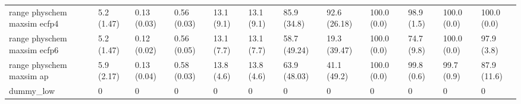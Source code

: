 \begin{tabular}{llllllllllll}
range physchem maxsim ecfp4 & {\cellcolor[HTML]{F0F9FB}} \color[HTML]{000000} 5.2 (1.47) & {\cellcolor[HTML]{E1F4F6}} \color[HTML]{000000} 0.13 (0.03) & {\cellcolor[HTML]{4DB585}} \color[HTML]{F1F1F1} 0.56 (0.03) & {\cellcolor[HTML]{F7FCFD}} \color[HTML]{000000} 13.1 (9.1) & {\cellcolor[HTML]{F7FCFD}} \color[HTML]{000000} 13.1 (9.1) & {\cellcolor[HTML]{05712F}} \color[HTML]{F1F1F1} 85.9 (34.8) & {\cellcolor[HTML]{005B25}} \color[HTML]{F1F1F1} 92.6 (26.18) & {\cellcolor[HTML]{00441B}} \color[HTML]{F1F1F1} 100.0 (0.0) & {\cellcolor[HTML]{00441B}} \color[HTML]{F1F1F1} 98.9 (1.5) & {\cellcolor[HTML]{00441B}} \color[HTML]{F1F1F1} 100.0 (0.0) & {\cellcolor[HTML]{006B2B}} \color[HTML]{F1F1F1} 100.0 (0.0) \\
range physchem maxsim ecfp6 & {\cellcolor[HTML]{F0F9FB}} \color[HTML]{000000} 5.2 (1.47) & {\cellcolor[HTML]{E1F4F6}} \color[HTML]{000000} 0.12 (0.02) & {\cellcolor[HTML]{4BB382}} \color[HTML]{F1F1F1} 0.56 (0.05) & {\cellcolor[HTML]{F7FCFD}} \color[HTML]{000000} 13.1 (7.7) & {\cellcolor[HTML]{F7FCFD}} \color[HTML]{000000} 13.1 (7.7) & {\cellcolor[HTML]{4CB484}} \color[HTML]{F1F1F1} 58.7 (49.24) & {\cellcolor[HTML]{D8F0EF}} \color[HTML]{000000} 19.3 (39.47) & {\cellcolor[HTML]{00441B}} \color[HTML]{F1F1F1} 100.0 (0.0) & {\cellcolor[HTML]{00441B}} \color[HTML]{F1F1F1} 74.7 (9.8) & {\cellcolor[HTML]{00441B}} \color[HTML]{F1F1F1} 100.0 (0.0) & {\cellcolor[HTML]{006328}} \color[HTML]{F1F1F1} 97.9 (3.8) \\
range physchem maxsim ap & {\cellcolor[HTML]{EFF9FB}} \color[HTML]{000000} 5.9 (2.17) & {\cellcolor[HTML]{E8F6FA}} \color[HTML]{000000} 0.13 (0.04) & {\cellcolor[HTML]{45B07B}} \color[HTML]{F1F1F1} 0.58 (0.03) & {\cellcolor[HTML]{F7FCFD}} \color[HTML]{000000} 13.8 (4.6) & {\cellcolor[HTML]{F7FCFD}} \color[HTML]{000000} 13.8 (4.6) & {\cellcolor[HTML]{3EAA70}} \color[HTML]{F1F1F1} 63.9 (48.03) & {\cellcolor[HTML]{8AD2BE}} \color[HTML]{000000} 41.1 (49.2) & {\cellcolor[HTML]{00441B}} \color[HTML]{F1F1F1} 100.0 (0.0) & {\cellcolor[HTML]{00451C}} \color[HTML]{F1F1F1} 99.8 (0.6) & {\cellcolor[HTML]{00441B}} \color[HTML]{F1F1F1} 99.7 (0.9) & {\cellcolor[HTML]{005221}} \color[HTML]{F1F1F1} 87.9 (11.6) \\
dummy_low & {\cellcolor[HTML]{F7FCFD}} \color[HTML]{000000} 0 & {\cellcolor[HTML]{F7FCFD}} \color[HTML]{000000} 0 & {\cellcolor[HTML]{F7FCFD}} \color[HTML]{000000} 0 & {\cellcolor[HTML]{F7FCFD}} \color[HTML]{000000} 0 & {\cellcolor[HTML]{F7FCFD}} \color[HTML]{000000} 0 & {\cellcolor[HTML]{F7FCFD}} \color[HTML]{000000} 0 & {\cellcolor[HTML]{F7FCFD}} \color[HTML]{000000} 0 & {\cellcolor[HTML]{F7FCFD}} \color[HTML]{000000} 0 & {\cellcolor[HTML]{F7FCFD}} \color[HTML]{000000} 0 & {\cellcolor[HTML]{F7FCFD}} \color[HTML]{000000} 0 & {\cellcolor[HTML]{F7FCFD}} \color[HTML]{000000} 0 \\

\end{tabular}
